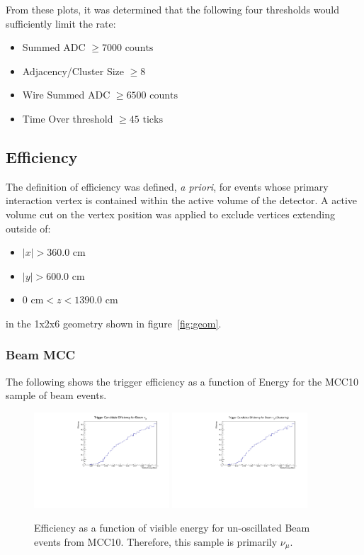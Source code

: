\documentclass[11pt]{article}
\begin{document}
From these plots, it was determined that the following four thresholds would sufficiently limit the rate:
\begin{itemize}
    \item Summed ADC $\geq 7000  \text{ counts}$
    \item Adjacency/Cluster Size $\geq 8$
    \item Wire Summed ADC $\geq 6500 \text{ counts}$
    \item Time Over threshold $\geq 45 \text{ ticks}$ 
\end{itemize}

\subsection{Efficiency}

The definition of efficiency was defined, \textit{a priori}, for events whose primary interaction vertex is contained within the active volume of the detector. A active volume cut on the vertex position was applied to exclude vertices extending outside of:
\begin{itemize}
    \item $\mid x \mid > 360.0$ cm
    \item $\mid y \mid > 600.0$ cm
    \item $0\text{ cm} <  z < 1390.0\text{ cm}$ 
\end{itemize}
in the 1x2x6 geometry shown in figure~\ref{fig:geom}. 

\subsubsection{Beam MCC}

The following shows the trigger efficiency as a function of Energy for the MCC10 sample of beam events.

\begin{figure}[H]
    \centering
    \includegraphics[angle=270,width=0.45\textwidth]{UpdatedEff/Differential_Nu_mu_Efficiency_MCC10.pdf}
    \includegraphics[angle=270,width=0.45\textwidth]{UpdatedEff/Differential_Nu_mu_Efficiency_MCC10_CLUS.pdf}
    \caption{Efficiency as a function of visible energy for un-oscillated Beam events from MCC10. Therefore, this sample is primarily $\nu_{\mu}$.}
    \label{fig:eff_beam_numu}
\end{figure}
\end{document}
